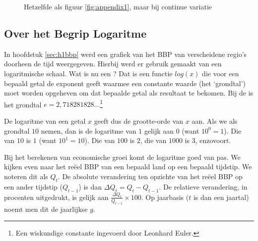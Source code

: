 \begin{figure}[H]
\vspace{0.5cm}
\centering
\captionsetup{justification=centering,margin=2cm}
\caption{Hetzelfde als figuur \ref{fig:appendix1}, maar bij continue variatie}
\label{fig:appendix2}
\end{figure}

\subsection{Over het Begrip Logaritme}\label{sec:applog}

In hoofdstuk \ref{sec:h1bbp} werd een grafiek van het BBP van verscheidene regio's doorheen de tijd weergegeven. Hierbij werd er gebruik gemaakt van een logaritmische schaal. Wat is nu een ? Dat is een functie $log(x)$ die voor een bepaald getal de exponent geeft waarmee een constante waarde (het `grondtal') moet worden opgeheven om dat bepaalde getal als resultaat te bekomen. Bij de  is het grondtal $e=2,718281828...$\footnote{Een wiskundige constante ingevoerd door Leonhard Euler.}
\par De logaritme van een getal $x$ geeft dus de grootte-orde van $x$ aan. Als we als grondtal $10$ nemen, dan is de logaritme van $1$ gelijk aan $0$ (want $10^0=1$). Die van $10$ is $1$ (want $10^1=10$). Die van $100$ is $2$, die van $1000$ is $3$, enzovoort.\\

\par Bij het berekenen van economische groei komt de logaritme goed van pas. We kijken even naar het re\"eel BBP van een bepaald land op een bepaald tijdstip. We noteren dit als $Q_t$. De absolute verandering ten opzichte van het re\"eel BBP op een ander tijdstip ($Q_{t-1}$) is dan $\Delta Q_t=Q_t-Q_{t-1}$. De relatieve verandering, in procenten uitgedrukt, is gelijk aan $\frac{\Delta Q_t}{Q_{t-1}}\times 100$. Op jaarbasis ($t$ is dan een jaartal) noemt men dit de jaarlijkse  $g$.\\

